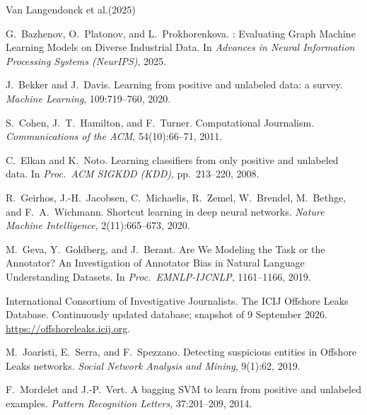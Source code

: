 \documentclass[11pt]{article}
\begin{document}
\begin{thebibliography}{Van Langendonck et al.(2025)}
\providecommand{\natexlab}[1]{#1}

G.~Bazhenov, O.~Platonov, and L.~Prokhorenkova.
: Evaluating Graph Machine Learning Models on Diverse
  Industrial Data.
\newblock In \emph{Advances in Neural Information Processing Systems (NeurIPS)},
  2025.

J.~Bekker and J.~Davis.
\newblock Learning from positive and unlabeled data: a survey.
\newblock \emph{Machine Learning}, 109:719--760, 2020.

S.~Cohen, J.~T.~Hamilton, and F.~Turner.
\newblock Computational Journalism.
\newblock \emph{Communications of the ACM}, 54(10):66--71, 2011.

C.~Elkan and K.~Noto.
\newblock Learning classifiers from only positive and unlabeled data.
\newblock In \emph{Proc.\ ACM SIGKDD (KDD)}, pp.~213--220, 2008.

R.~Geirhos, J.-H.~Jacobsen, C.~Michaelis, R.~Zemel, W.~Brendel, M.~Bethge, and
  F.~A.~Wichmann.
\newblock Shortcut learning in deep neural networks.
\newblock \emph{Nature Machine Intelligence}, 2(11):665--673, 2020.

M.~Geva, Y.~Goldberg, and J.~Berant.
\newblock Are We Modeling the Task or the Annotator? An Investigation of Annotator
  Bias in Natural Language Understanding Datasets.
\newblock In \emph{Proc.\ EMNLP-IJCNLP}, 1161--1166, 2019.

International Consortium of Investigative Journalists.
\newblock The {ICIJ} Offshore Leaks Database. Continuously updated database;
  snapshot of 9 September 2026.
\newblock \url{https://offshoreleaks.icij.org}.

M.~Joaristi, E.~Serra, and F.~Spezzano.
\newblock Detecting suspicious entities in Offshore Leaks networks.
\newblock \emph{Social Network Analysis and Mining}, 9(1):62, 2019.

F.~Mordelet and J.-P.~Vert.
\newblock A bagging {SVM} to learn from positive and unlabeled examples.
\newblock \emph{Pattern Recognition Letters}, 37:201--209, 2014.


\end{thebibliography}
\end{document}
